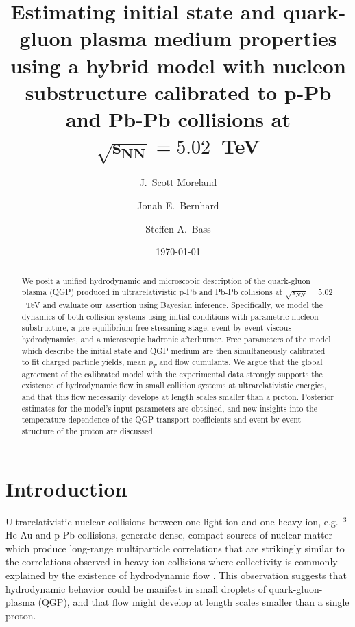\documentclass[aps,prc,reprint,amsmath,nofootinbib]{revtex4-1}
\newcommand{\sqrts}{\sqrt{s_{NN}}}
\def\\#1{ #1}
\begin{document}
\title{
  Estimating initial state and quark-gluon plasma medium properties\\
  using a hybrid model with nucleon substructure\\
  calibrated to p-Pb and Pb-Pb collisions at \texorpdfstring{$\mathbf{\sqrts=5.02}$}{}~TeV
}

\author{J.\ Scott Moreland}
\author{Jonah E.\ Bernhard}
\author{Steffen A.\ Bass}


\date{\today}

\begin{abstract}
  We posit a unified hydrodynamic and microscopic description of the quark-gluon plasma (QGP) produced in ultrarelativistic p-Pb and Pb-Pb collisions at $\sqrts=5.02$~TeV and evaluate our assertion using Bayesian inference. Specifically, we model the dynamics of both collision systems using initial conditions with parametric nucleon substructure, a pre-equilibrium free-streaming stage, event-by-event viscous hydrodynamics, and a microscopic hadronic afterburner.
Free parameters of the model which describe the initial state and QGP medium are then simultaneously calibrated to fit charged particle yields, mean $p_T$ and flow cumulants.
We argue that the global agreement of the calibrated model with the experimental data strongly supports the existence of hydrodynamic flow in small collision systems at ultrarelativistic energies, and that this flow necessarily develops at length scales smaller than a proton.
Posterior estimates for the model's input parameters are obtained, and new insights into the temperature dependence of the QGP transport coefficients and event-by-event structure of the proton are discussed.
\end{abstract}

\maketitle


\section{Introduction}

Ultrarelativistic nuclear collisions between one light-ion and one heavy-ion, e.g.\ $^3$He-Au and p-Pb collisions, generate dense, compact sources of nuclear matter which produce long-range multiparticle correlations that are strikingly similar to the correlations observed in heavy-ion collisions where collectivity is commonly explained by the existence of hydrodynamic flow \cite{CMS:2012qk, Abelev:2012ola, Aad:2012gla, Adare:2015ctn}.
This observation suggests that hydrodynamic behavior could be manifest in small droplets of quark-gluon-plasma (QGP), and that flow might develop at length scales smaller than a single proton.
\end{document}
